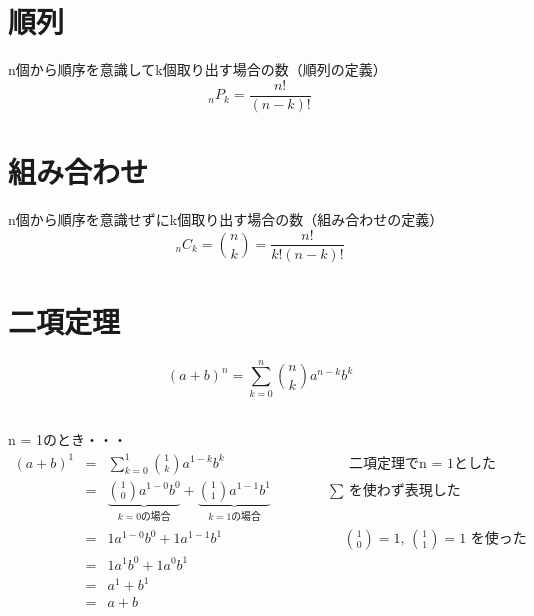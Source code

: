 \documentclass[fleqn,leqno,autodetect-engine,dvipdfmx-if-dvi,ja=standard]{bxjsarticle}
\begin{document}
\section{順列}

n個から順序を意識してk個取り出す場合の数（順列の定義）
\[ {}_n P _k  =  \frac{n!}{(n-k)!} \]

\section{組み合わせ}

n個から順序を意識せずにk個取り出す場合の数（組み合わせの定義）
\[ {}_n C _k = \binom nk = \frac{n!}{k!(n-k)!}  
\]

\section{二項定理}

\[
 (a + b)^n = \sum_{k=0}^n \binom nk a^{n-k} b^k
\]

\ \\
n = 1のとき・・・
\begin{eqnarray*}
 (a + b)^1 &=& \sum_{k=0}^1 \binom 1k a^{1-k} b^k \qquad \qquad \qquad \qquad \ \ \ \  \text{二項定理でn = 1とした}\\
  &=& \underbrace{ 
        \binom 10 a^{1-0} b^0
        }_{k = 0の場合}
        +
        \underbrace{
        \binom 11 a^{1-1} b^1
        }_{k = 1の場合} \qquad \qquad \text{$\sum$ を使わず表現した}\\
  &=& 1a^{1-0} b^0 + 1a^{1-1} b^1 \qquad \qquad \qquad \qquad \ \ \ \text{$\binom {1}{0} = 1$,                                                                     
                                                                    $\binom {1}{1} = 1$ を使った}\\
  &=& 1a^1b^0 + 1a^0b^1\\
  &=& a^1 + b^1\\
  &=& a + b
\end{eqnarray*}
\end{document}
